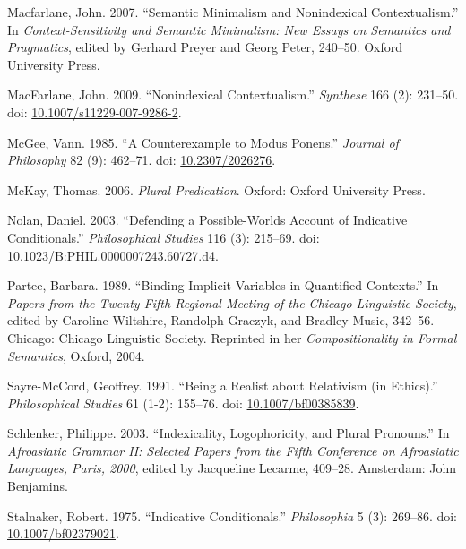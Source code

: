 \documentclass[
  10pt,
  letterpaper,
  DIV=11,
  numbers=noendperiod,
  twoside]{scrartcl}
\newlength{\cslhangindent}
\newenvironment{CSLReferences}[2] %
 {\begin{list}{}{%
  \setlength{\itemindent}{0pt}
  \setlength{\leftmargin}{0pt}
  \setlength{\parsep}{0pt}
  \ifodd #1
   \setlength{\leftmargin}{\cslhangindent}
   \setlength{\itemindent}{-1\cslhangindent}
  \fi
  \setlength{\itemsep}{#2\baselineskip}}}
 {\end{list}}
\begin{document}
\begin{CSLReferences}{1}{0}
Macfarlane, John. 2007. {``Semantic Minimalism and Nonindexical
Contextualism.''} In \emph{Context-Sensitivity and Semantic Minimalism:
New Essays on Semantics and Pragmatics}, edited by Gerhard Preyer and
Georg Peter, 240--50. Oxford University Press.

MacFarlane, John. 2009. {``{Nonindexical Contextualism}.''}
\emph{Synthese} 166 (2): 231--50. doi:
\href{https://doi.org/10.1007/s11229-007-9286-2}{10.1007/s11229-007-9286-2}.

McGee, Vann. 1985. {``A Counterexample to Modus Ponens.''} \emph{Journal
of Philosophy} 82 (9): 462--71. doi:
\href{https://doi.org/10.2307/2026276}{10.2307/2026276}.

McKay, Thomas. 2006. \emph{Plural Predication}. Oxford: Oxford
University Press.

Nolan, Daniel. 2003. {``{Defending a Possible-Worlds Account of
Indicative Conditionals}.''} \emph{Philosophical Studies} 116 (3):
215--69. doi:
\href{https://doi.org/10.1023/B:PHIL.0000007243.60727.d4}{10.1023/B:PHIL.0000007243.60727.d4}.

Partee, Barbara. 1989. {``Binding Implicit Variables in Quantified
Contexts.''} In \emph{Papers from the Twenty-Fifth Regional Meeting of
the Chicago Linguistic Society}, edited by Caroline Wiltshire, Randolph
Graczyk, and Bradley Music, 342--56. Chicago: Chicago Linguistic
Society. Reprinted in her \emph{Compositionality in Formal Semantics},
Oxford, 2004.

Sayre-McCord, Geoffrey. 1991. {``Being a Realist about Relativism (in
Ethics).''} \emph{Philosophical Studies} 61 (1-2): 155--76. doi:
\href{https://doi.org/10.1007/bf00385839}{10.1007/bf00385839}.

Schlenker, Philippe. 2003. {``Indexicality, Logophoricity, and Plural
Pronouns.''} In \emph{Afroasiatic Grammar II: Selected Papers from the
Fifth Conference on Afroasiatic Languages, Paris, 2000}, edited by
Jacqueline Lecarme, 409--28. Amsterdam: John Benjamins.

Stalnaker, Robert. 1975. {``{Indicative Conditionals}.''}
\emph{Philosophia} 5 (3): 269--86. doi:
\href{https://doi.org/10.1007/bf02379021}{10.1007/bf02379021}.


\end{CSLReferences}
\end{document}
